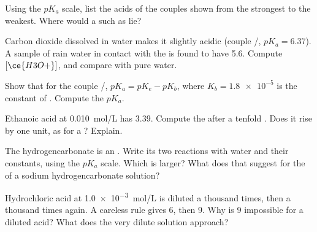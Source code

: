 \begin{exercise}[$\star\star$]\label{exo:g12:ka-and-pka:9}
Using the $pK_a$ scale, list the acids of the couples shown from the
strongest to the weakest. Where would a  such as 
lie?
\end{exercise}

\begin{exercise}[$\star\star$]\label{exo:g12:ka-and-pka:10}
Carbon dioxide dissolved in water makes it slightly acidic (couple
/, $pK_a = 6.37$). A sample of rain water in contact with the
 is found to have  5.6. Compute $[\ce{H3O+}]$, and compare with pure water.
\end{exercise}

\begin{exercise}[$\star\star$]\label{exo:g12:ka-and-pka:11}
Show that for the couple /, $pK_a = pK_e - pK_b$, where
$K_b = \num{1.8e-5}$ is the constant of .
Compute the $pK_a$.
\end{exercise}

\begin{exercise}[$\star\star\star$]\label{exo:g12:ka-and-pka:12}
Ethanoic acid at \qty{0.010}{mol/L} has  3.39. Compute the  after a
tenfold . Does it rise by one unit, as for a ?
Explain.
\end{exercise}

\begin{exercise}[$\star\star\star$]\label{exo:g12:ka-and-pka:13}
The hydrogencarbonate  is an . Write its two reactions with
water and their constants, using the $pK_a$ scale. Which is larger?
What does that suggest for the  of a sodium hydrogencarbonate
solution?
\end{exercise}

\begin{exercise}[$\star\star\star$]\label{exo:g12:ka-and-pka:14}
Hydrochloric acid at \qty{1.0e-3}{mol/L} is diluted a thousand times,
then a thousand times again. A careless rule gives  6, then  9. Why is
 9 impossible for a diluted acid? What  does the very dilute solution
approach?
\end{exercise}


